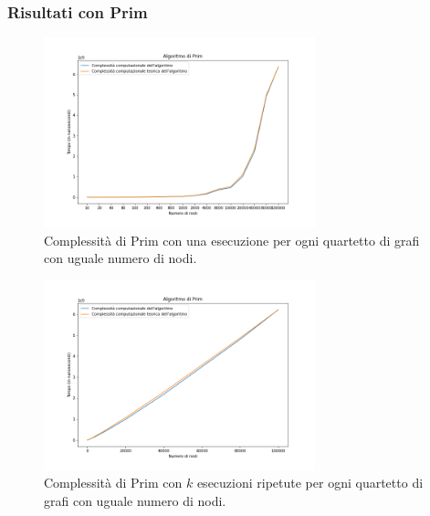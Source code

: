 \subsubsection{Risultati con Prim}

\begin{figure}[H]
	\centering
	\includegraphics[width=0.7\textwidth]{res/images/graph-no-rep/prim_senza_ripetizioni.png}
    \caption{Complessità di Prim con una esecuzione per ogni quartetto di grafi con uguale numero di nodi.}
	\label{fig:primnr}
\end{figure}

\begin{figure}[H]
	\centering
	\includegraphics[width=0.7\textwidth]{res/images/graph-complexity/prim.png}
		\caption{Complessità di Prim con \(k\) esecuzioni ripetute per ogni quartetto di grafi con uguale numero di nodi.}
	\label{fig:prim}
\end{figure}

